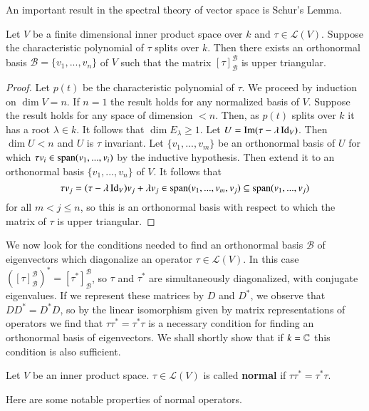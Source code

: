An important result in the spectral theory of vector space is Schur's Lemma.

\begin{lemma}
    Let $V$ be a finite dimensional inner product space over $k$ and $\tau \in \mathcal{L}(V)$. Suppose the characteristic polynomial of $\tau$ splits over $k$. Then there exists an orthonormal basis $\mathcal{B} = \{v_1,...,v_n\}$ of $V$ such that the matrix $[\tau]_{\mathcal{B}}^{\mathcal{B}}$ is upper triangular.
\end{lemma}
\begin{proof}
    Let $p(t)$ be the characteristic polynomial of $\tau$. We proceed by induction on $\dim V = n$. If $n = 1$ the result holds for any normalized basis of $V$. Suppose the result holds for any space of dimension $< n$. Then, as $p(t)$ splits over $k$ it has a root $\lambda \in k$. It follows that $\dim E_{\lambda} \geq 1$. Let $U = \operatorname{Im}(\tau-\lambda \operatorname{Id}_V)$. Then $\dim U < n$ and $U$ is $\tau$ invariant. Let $\{v_1,...,v_m\}$ be an orthonormal basis of $U$ for which $\tau v_i \in \operatorname{span}(v_1,...,v_i)$ by the inductive hypothesis. Then extend it to an orthonormal basis $\{v_1,...,v_n\}$ of $V$. It follows that \begin{equation*}
        \tau v_j = (\tau-\lambda \operatorname{Id}_V) v_j +\lambda v_j \in \operatorname{span}(v_1,...,v_m,v_j) \subseteq \operatorname{span}(v_1,...,v_j)
    \end{equation*}
    for all $m < j \leq n$, so this is an orthonormal basis with respect to which the matrix of $\tau$ is upper triangular.
\end{proof}

We now look for the conditions needed to find an orthonormal basis $\mathcal{B}$ of eigenvectors which diagonalize an operator $\tau \in \mathcal{L}(V)$. In this case $([\tau]_{\mathcal{B}}^{\mathcal{B}})^* = [\tau^*]_{\mathcal{B}}^{\mathcal{B}}$, so $\tau$ and $\tau^*$ are simultaneously diagonalized, with conjugate eigenvalues. If we represent these matrices by $D$ and $D^*$, we observe that $DD^* = D^*D$, so by the linear isomorphism given by matrix representations of operators we find that $\tau\tau^* = \tau^*\tau$ is a necessary condition for finding an orthonormal basis of eigenvectors. We shall shortly show that if $k = \mathbb C$ this condition is also sufficient.

\begin{definition}
    Let $V$ be an inner product space. $\tau \in \mathcal{L}(V)$ is called \textbf{normal} if $\tau\tau^* = \tau^*\tau$.
\end{definition}
Here are some notable properties of normal operators.

